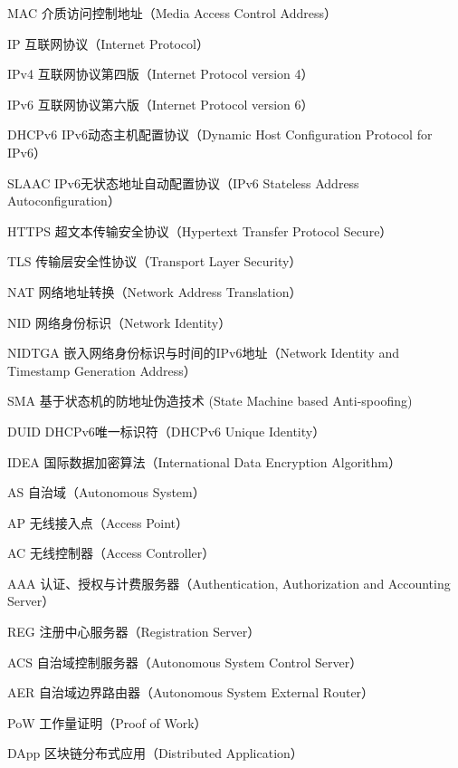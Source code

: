 
\begin{denotation}[3cm]
\item[MAC] 介质访问控制地址（Media Access Control Address）
\item[IP] 互联网协议（Internet Protocol）
\item[IPv4] 互联网协议第四版（Internet Protocol version 4）
\item[IPv6] 互联网协议第六版（Internet Protocol version 6）
\item[DHCPv6] IPv6动态主机配置协议（Dynamic Host Configuration Protocol for IPv6）
\item[SLAAC] IPv6无状态地址自动配置协议（IPv6 Stateless Address Autoconfiguration）
\item[HTTPS] 超文本传输安全协议（Hypertext Transfer Protocol Secure）
\item[TLS] 传输层安全性协议（Transport Layer Security）
\item[NAT] 网络地址转换（Network Address Translation）
\item[NID] 网络身份标识（Network Identity）
\item[NIDTGA] 嵌入网络身份标识与时间的IPv6地址（Network Identity and Timestamp Generation Address）
\item[SMA] 基于状态机的防地址伪造技术 (State Machine based Anti-spoofing)
\item[DUID] DHCPv6唯一标识符（DHCPv6 Unique Identity）
\item[IDEA] 国际数据加密算法（International Data Encryption Algorithm）
\item[AS] 自治域（Autonomous System）
\item[AP] 无线接入点（Access Point）
\item[AC] 无线控制器（Access Controller）
\item[AAA] 认证、授权与计费服务器（Authentication, Authorization and Accounting Server）
\item[REG] 注册中心服务器（Registration Server）
\item[ACS] 自治域控制服务器（Autonomous System Control Server）
\item[AER] 自治域边界路由器（Autonomous System External Router）
\item[PoW] 工作量证明（Proof of Work）
\item[DApp] 区块链分布式应用（Distributed Application）
\end{denotation}




